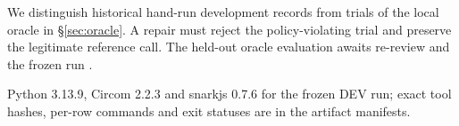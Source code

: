  We distinguish historical hand-run development records
from trials of the local oracle in \S\ref{sec:oracle}. A repair must reject
the policy-violating trial and preserve the legitimate reference call.
The held-out oracle evaluation awaits re-review and the frozen run
.

 Python 3.13.9, Circom 2.2.3 and snarkjs 0.7.6 for the
frozen DEV run; exact tool hashes, per-row commands and exit statuses are in
the artifact manifests.%
